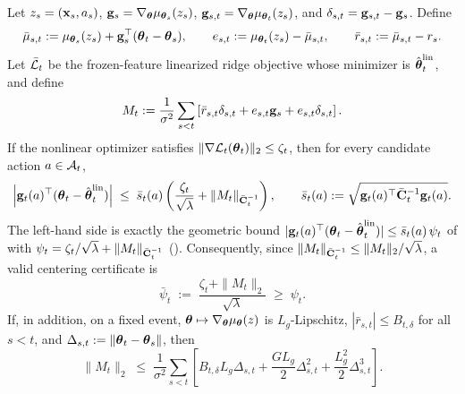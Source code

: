 \begin{lemma}\label{lem:primitive-pred}
Let $z_s=(\mathbf{x}_s,a_s)$,
$\mathbf{g}_s=\nabla_{\boldsymbol{\theta}}\mu_{\boldsymbol{\theta}_s}(z_s)$,
$\mathbf{g}_{s,t}=\nabla_{\boldsymbol{\theta}}\mu_{\boldsymbol{\theta}_t}(z_s)$, and
$\delta_{s,t}=\mathbf{g}_{s,t}-\mathbf{g}_s$.  Define
\[
  \bar\mu_{s,t}
  :=
  \mu_{\boldsymbol{\theta}_s}(z_s)+\mathbf{g}_s^\top(\boldsymbol{\theta}_t-\boldsymbol{\theta}_s),
  \qquad
  e_{s,t}:=\mu_{\boldsymbol{\theta}_t}(z_s)-\bar\mu_{s,t},
  \qquad
  \bar r_{s,t}:=\bar\mu_{s,t}-r_s .
\]
Let $\bar{\mathcal{L}}_t$ be the frozen-feature linearized ridge objective whose
minimizer is $\hat{\boldsymbol{\theta}}_t^{\mathrm{lin}}$, and define
\[
  M_t
  :=
  \frac{1}{\sigma^2}
  \sum_{s<t}
  \left[
    \bar r_{s,t}\delta_{s,t}
    +
    e_{s,t}\mathbf{g}_s
    +
    e_{s,t}\delta_{s,t}
  \right].
\]
If the nonlinear optimizer satisfies
$\|\nabla \mathcal{L}_t(\boldsymbol{\theta}_t)\|_2\le\zeta_t$, then for every candidate
action $a\in\mathcal{A}_t$,
\[
  \left|
  \mathbf{g}_t(a)^\top
  (\boldsymbol{\theta}_t-\hat{\boldsymbol{\theta}}_t^{\mathrm{lin}})
  \right|
  \;\le\;
  \bar s_t(a)
  \left(
    \frac{\zeta_t}{\sqrt{\lambda}}
    +
    \|M_t\|_{\bar{\mathbf{C}}_t^{-1}}
  \right),
  \qquad
  \bar s_t(a):=\sqrt{\mathbf{g}_t(a)^\top\bar{\mathbf{C}}_t^{-1}\mathbf{g}_t(a)} .
\]
The left-hand side is exactly the geometric bound
$|\mathbf{g}_t(a)^\top(\boldsymbol{\theta}_t-\hat{\boldsymbol{\theta}}_t^{\mathrm{lin}})|\le\bar s_t(a)\,\psi_t$
of  with $\psi_t=\zeta_t/\sqrt\lambda+\|M_t\|_{\bar{\mathbf{C}}_t^{-1}}$
().  Consequently, since
$\|M_t\|_{\bar{\mathbf{C}}_t^{-1}}\le\|M_t\|_2/\sqrt{\lambda}$, a valid centering
certificate is
\[
  \bar\psi_t
  \;:=\;
  \frac{\zeta_t+\|M_t\|_2}{\sqrt{\lambda}}
  \;\ge\;
  \psi_t .
\]
If, in addition, on a fixed event,
$\boldsymbol{\theta}\mapsto\nabla_{\boldsymbol{\theta}}\mu_{\boldsymbol{\theta}}(z)$ is $L_g$-Lipschitz,
$|\bar r_{s,t}|\le B_{t,\delta}$ for all $s<t$, and
$\Delta_{s,t}:=\|\boldsymbol{\theta}_t-\boldsymbol{\theta}_s\|$, then
\[
  \|M_t\|_2
  \;\le\;
  \frac{1}{\sigma^2}
  \sum_{s<t}
  \left[
    B_{t,\delta} L_g\Delta_{s,t}
    +
    \frac{G L_g}{2}\Delta_{s,t}^2
    +
    \frac{L_g^2}{2}\Delta_{s,t}^3
  \right].
\]
\end{lemma}

